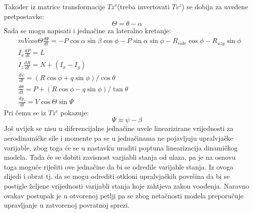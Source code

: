 Također iz matrice transformacije $Tz^v$(treba invertovati $Tv^z$) se dobija za uvedene pretpostavke:
\begin{equation}
    \Theta = \theta - \alpha
\end{equation}
Sada se mogu napisati i jednačine za lateralno kretanje:
\begin{align}
    &mVcos\Theta \frac{d\Psi}{dt}=-P\cos\alpha \sin\beta \cos\phi - P\sin\alpha\sin\phi 
    - R_{side}\cos\phi - R_{uzg}\sin\phi\\
    &I_x\frac{dP}{dt}=L\\
    &I_z\frac{dR}{dt}=N+(I_x-I_y)\\
    &\frac{d\psi}{dt}=(R\cos\phi+q\sin\phi)/\cos\theta\\
    &\frac{d\theta}{dt}=P+(R\cos\phi - q\sin\phi)/\tan\theta\\
    &\frac{dy_z}{dt}=V\cos\Theta\sin\Psi
\end{align}
Pri čemu se iz $Tz^v$ pokazuje:
\begin{equation}
    \Psi \approx \psi-\beta
\end{equation}
Još uvijek se nisu u diferencijalne jednačine uvele linearizirane vrijednosti za aerodinamičke 
sile i momente pa se u jednačinama ne pojavljuju upralvjačke varijable, zbog toga će se u nastavku uraditi
poptuna linearizacija dinamičkog modela. Tada će se dobiti zavisnost varjiabli stanja od ulaza, pa 
je na osnovu toga moguće riješiti ove jednačine da bi se odredile varijable stanja. Iz ovoga slijedi i obrat 
tj. da se mogu odrediti otkloni upralvjačkih površina da bi se postigle željene vrijednosti varijabli stanja 
koje zahtjeva zakon voođenja. Naravno ovakav postupak je u otvorenoj petlji pa se zbog netačnosti modela 
preporučuje upravljanje u zatvorenoj povratnoj sprezi. 

